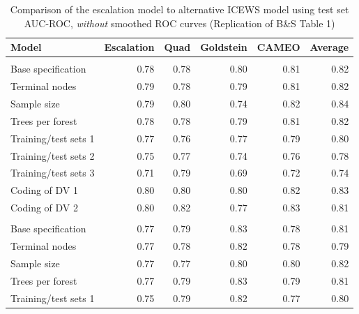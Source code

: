 \documentclass[
]{article}
\begin{document}
\begin{table}

\caption{\label{tab:table1-nosmooth}Comparison of the escalation model to alternative ICEWS model using test set AUC-ROC, \textit{without} smoothed ROC curves (Replication of B\&S Table 1)}
\centering
\begin{tabular}[t]{lrrrrr}
\toprule
Model & Escalation & Quad & Goldstein & CAMEO & Average\\
\midrule
\addlinespace[0.3em]
\multicolumn{6}{l}{\textbf{One-month forecasts}}\\
\hspace{1em}Base specification & 0.78 & 0.78 & 0.80 & 0.81 & 0.82\\
\hspace{1em}Terminal nodes & 0.79 & 0.78 & 0.79 & 0.81 & 0.82\\
\hspace{1em}Sample size & 0.79 & 0.80 & 0.74 & 0.82 & 0.84\\
\hspace{1em}Trees per forest & 0.78 & 0.78 & 0.79 & 0.81 & 0.82\\
\hspace{1em}Training/test sets 1 & 0.77 & 0.76 & 0.77 & 0.79 & 0.80\\
\hspace{1em}Training/test sets 2 & 0.75 & 0.77 & 0.74 & 0.76 & 0.78\\
\hspace{1em}Training/test sets 3 & 0.71 & 0.79 & 0.69 & 0.72 & 0.74\\
\hspace{1em}Coding of DV 1 & 0.80 & 0.80 & 0.80 & 0.82 & 0.83\\
\hspace{1em}Coding of DV 2 & 0.80 & 0.82 & 0.77 & 0.83 & 0.81\\
\addlinespace[0.3em]
\multicolumn{6}{l}{\textbf{Six-month forecasts}}\\
\hspace{1em}Base specification & 0.77 & 0.79 & 0.83 & 0.78 & 0.81\\
\hspace{1em}Terminal nodes & 0.77 & 0.78 & 0.82 & 0.78 & 0.79\\
\hspace{1em}Sample size & 0.77 & 0.77 & 0.80 & 0.80 & 0.82\\
\hspace{1em}Trees per forest & 0.77 & 0.79 & 0.83 & 0.79 & 0.81\\
\hspace{1em}Training/test sets 1 & 0.75 & 0.79 & 0.82 & 0.77 & 0.80\\

\end{tabular}
\end{table}
\end{document}
